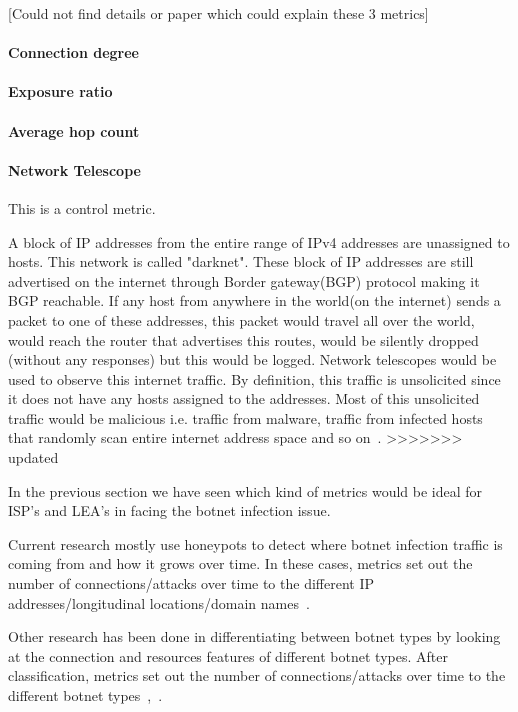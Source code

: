 [Could not find details or paper which could explain these 3 metrics]
\paragraph{ Connection degree}

\paragraph{ Exposure ratio }

\paragraph{ Average hop count }

\paragraph{Network Telescope}
This is a control metric.

A block of IP addresses from the entire range of IPv4 addresses are unassigned to hosts. This network is called "darknet". These block of IP addresses are still advertised on the internet through Border gateway(BGP) protocol making it BGP reachable. If any host from anywhere in the world(on the internet) sends a packet to one of these addresses, this packet would travel all over the world, would reach the router that advertises this routes, would be silently dropped (without any responses) but this would be logged. Network telescopes would be used to observe this internet traffic. By definition, this traffic is unsolicited since it does not have any hosts assigned to the addresses. Most of this unsolicited traffic would be malicious i.e. traffic from malware, traffic from infected hosts that randomly scan entire internet address space and so on~\cite{AM2014}.
>>>>>>> updated

In the previous section we have seen which kind of metrics would be ideal for ISP's and LEA's in facing the botnet infection issue.

Current research mostly use honeypots to detect where botnet infection traffic is coming from and how it grows over time. In these cases, metrics set out the number of connections/attacks over time to the different IP addresses/longitudinal locations/domain names~\cite{AM2006}.

Other research has been done in differentiating between botnet types by looking at the connection and resources features of different botnet types. After classification, metrics set out the number of connections/attacks over time to the different botnet types~\cite{GJ2007},~\cite{AM2005}.


